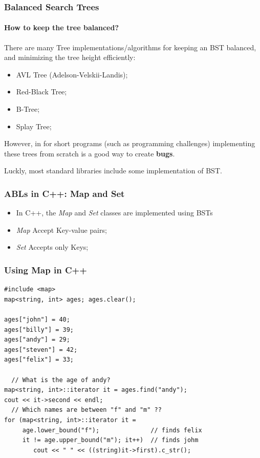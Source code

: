 \begin{frame}
  \frametitle{Balanced Search Trees}
  \framesubtitle{How to keep the tree balanced?}

  There are many Tree implementations/algorithms for keeping an BST
  balanced, and minimizing the tree height efficiently:
  \begin{itemize}
  \item AVL Tree (Adelson-Velskii-Landis);
  \item Red-Black Tree;
  \item B-Tree;
  \item Splay Tree;
  \end{itemize}
  \bigskip

  However, in for short programs (such as programming challenges)
  implementing these trees from scratch is a good way to create {\bf bugs}.
  \bigskip

  Luckly, most standard libraries include some implementation of BST.
\end{frame}

\begin{frame}
  \frametitle{ABLs in C++: Map and Set}

  \begin{itemize}
  \item In C++, the \emph{Map} and \emph{Set} classes are implemented
    using BSTs
  \item \emph{Map} Accept Key-value pairs;
  \item \emph{Set} Accepts only Keys;
  \end{itemize}

\end{frame}

\begin{frame}[fragile]
  \frametitle{Using Map in C++}
  {\small
  \begin{block}{}
\begin{verbatim}
#include <map>
map<string, int> ages; ages.clear();

ages["john"] = 40;
ages["billy"] = 39;
ages["andy"] = 29;
ages["steven"] = 42;
ages["felix"] = 33;

  // What is the age of andy?
map<string, int>::iterator it = ages.find("andy");
cout << it->second << endl;
  // Which names are between "f" and "m" ??
for (map<string, int>::iterator it =
     age.lower_bound("f");              // finds felix
     it != age.upper_bound("m"); it++)  // finds johm
        cout << " " << ((string)it->first).c_str();
\end{verbatim}
\end{block}}
\end{frame}

